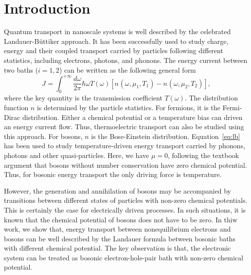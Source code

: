 \documentclass[aps
,floatfix,footinbib,
preprint
]{revtex4-1}
\begin{document}
\section{Introduction}
Quantum transport in nanoscale systems is well described by the celebrated Landauer-B\"uttiker approach. It has been successfully used to study charge, energy and their coupled transport carried by particles following different statistics, including electrons\cite{}, photons\cite{ojanen2008mesoscopic}, and phonons\cite{wang2006nonequilibrium,wang2007nonequilibrium,wang2008quantum,ruokola2009thermal,li2012colloquium,taylor2015quantum,wang2016landauer}. 
The energy current between two baths ($i=1,2$) can be written as the following general form
\begin{equation}
J_{}=\int_{0}^{+\infty}\frac{d\omega}{2\pi}\hbar\omega T(\omega)[n_{}(\omega,\mu_{1},T_{1})-n_{}(\omega,\mu_{2},T_{2})],
\label{eq:lb}
\end{equation}
where the key quantity is the transmission coefficient $T(\omega)$. The distribution function $n$ is determined by the particle statistics. For fermions, it is the Fermi-Dirac distribution. Either a chemical potential or a temperature bias can driven an energy current flow. Thus, thermoelectric transport can also be studied using this approach. For bosons, $n$ is the Bose-Einstein distribution. Equation~\ref{eq:lb} has been used to study temperature-driven energy transport carried by phonons, photons and other quasi-particles. Here, we have $\mu=0$, following the textbook argument that bosons without number conservation have zero chemical potential. Thus, for bosonic energy transport the only driving force is temperature.

However, the generation and annihilation of bosons may be accompanied by transitions between different states of particles with non-zero chemical potentials. This is certainly the case for electrically driven processes. In such situations, it is known that the chemical potential of bosons does not have to be zero. In thiw work, we show that, energy transport between nonequilibrium electrons and bosons can be well described by the Landauer formula between bosonic baths with different chemical potential. The key observation is that, the electronic system can be treated as bosonic electron-hole-pair bath with non-zero chemical potential.







\end{document}
